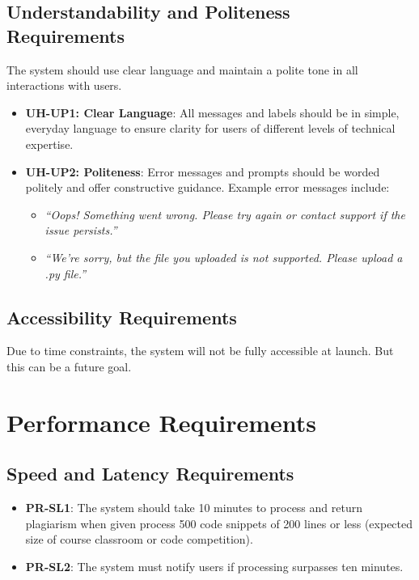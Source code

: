 \documentclass[12pt]{article}
\begin{document}
\subsection{Understandability and Politeness Requirements}
The system should use clear language and maintain a polite tone in all 
interactions with users.
\begin{itemize}
    \item \textbf{UH-UP1: Clear Language}: All messages and labels should be in simple, 
    everyday language to ensure clarity for users of different levels of 
    technical expertise.
    
    \item \textbf{UH-UP2: Politeness}: Error messages and prompts should be worded 
    politely and offer constructive guidance. Example error messages include:
    \begin{itemize}
        \item \textit{“Oops! Something went wrong. Please try again or contact 
        support if the issue persists.”}
        \item \textit{“We're sorry, but the file you uploaded is not supported. 
        Please upload a .py file.”}
    \end{itemize}
\end{itemize}

\subsection{Accessibility Requirements}
Due to time constraints, the system will not be fully accessible at launch. But this can be a future goal.

\section{Performance Requirements}
\subsection{Speed and Latency Requirements}
\begin{itemize}
    \item \textbf{PR-SL1}: The system should take 10 minutes to process and return plagiarism 
    when given process 500 code snippets of 200 lines or less (expected size of course classroom 
    or code competition).
    \item \textbf{PR-SL2}: The system must notify users if processing surpasses ten minutes.
\end{itemize}
\end{document}
